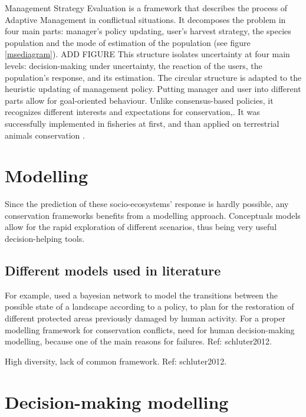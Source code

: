 \documentclass[12pt,a4paper]{article}
\begin{document}
Management Strategy Evaluation is a framework that describes the process of Adaptive Management in conflictual situations.
It decomposes the problem in four main parts: manager's policy updating, user's harvest strategy, the species population and the mode of estimation of the population (see figure \ref{msediagram}). ADD FIGURE
This structure isolates uncertainty at four main levels: decision-making under uncertainty, the reaction of the users, the population's response,
and its estimation.
The circular structure is adapted to the heuristic updating of management policy.
Putting manager and user into different parts allow for goal-oriented behaviour.
Unlike consensus-based policies, it recognizes different interests and expectations for conservation,.
It was successfully implemented in fisheries at first, and than applied on terrestrial animals conservation \citep{BUNNEFELD2011441, bunnefeld2013incentivizing}.

\section{Modelling}

Since the prediction of these socio-ecosystems' response is hardly possible, any conservation frameworks benefits from a modelling approach.
Conceptuals models allow for the rapid exploration of different scenarios, thus being very useful decision-helping tools.

\subsection{Different models used in literature}

For example, \cite{rumpff2011state} used a bayesian network to model the transitions between the possible state of a landscape according to a policy, to plan for the restoration of different protected areas previously damaged by human activity.
\citep{schluter2012new} 
For a proper modelling framework for conservation conflicts, need for human decision-making modelling, because one of the main reasons for failures. Ref: schluter2012.

High diversity, lack of common framework. Ref: schluter2012.\\

\section{Decision-making modelling}
\end{document}
